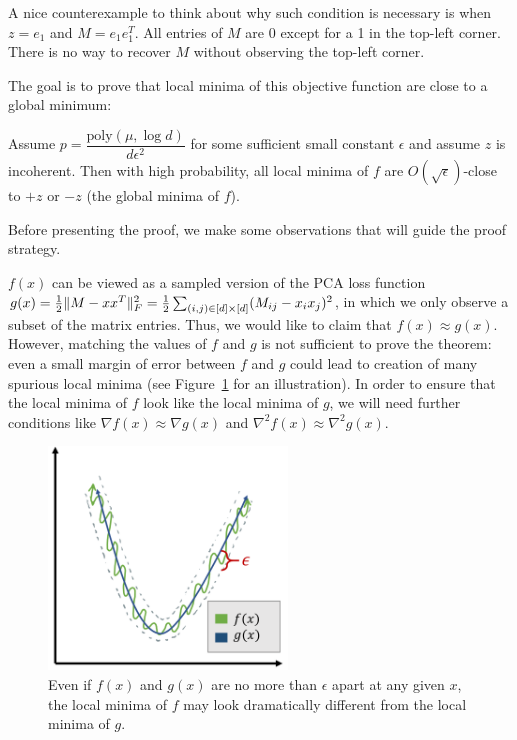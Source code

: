 \begin{remark}
A nice counterexample to think about why such condition is necessary is when $z = e_1$ and $M = e_1 e_1^T$. All entries of $M$ are 0 except for a 1 in the top-left corner. There is no way to recover $M$ without observing the top-left corner.
\end{remark}

The goal is to prove that local minima of this objective function are close to a global minimum:

\begin{theorem}\label{lec11:thm:matrix-completion}
Assume $p = \dfrac{\textrm{poly}(\mu, \log d)}{d\epsilon^2}$ for some sufficient small constant $\epsilon$ and assume $z$ is incoherent. Then with high probability, all local minima of $f$ are $O(\sqrt{\epsilon})$-close to $+z$ or $-z$ (the global minima of $f$).
\end{theorem}

Before presenting the proof, we make some observations that will guide the proof strategy.

\begin{remark}
$f(x)$ can be viewed as a sampled version of the PCA loss function $g(x) = \frac{1}{2}\|M - xx^T\|_F^2 = \frac{1}{2}\sum_{(i,j) \in [d]\times[d]} (M_{ij} - x_ix_j)^2$, in which we only observe a subset of the matrix entries. Thus, we would like to claim that $f(x) \approx g(x)$. However, matching the values of $f$ and $g$ is not sufficient to prove the theorem: even a small margin of error between $f$ and $g$ could lead to creation of many spurious local minima (see Figure~\ref{lec11:fig:matrix_completion_f_g} for an illustration). In order to ensure that the local minima of $f$ look like the local minima of $g$, we will need further conditions like $\nabla f(x) \approx \nabla g(x)$ and $\nabla^2 f(x) \approx \nabla^2 g(x)$.
\end{remark}

\begin{figure}
    \centering
    \includegraphics[width=2.5in]{figures/matrix-completion-f-g.png}
    \caption{Even if $f(x)$ and $g(x)$ are no more than $\epsilon$ apart at any given $x$, the local minima of $f$ may look dramatically different from the local minima of $g$.}
    \label{lec11:fig:matrix_completion_f_g}
\end{figure}

